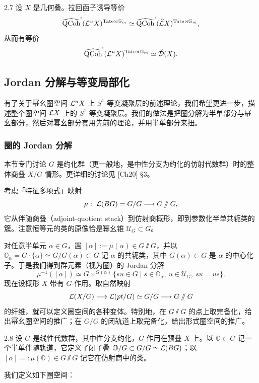\begin{thm}{2.7}\label{thm:a5-02-3}
设 $X$ 是几何叠。拉回函子诱导等价
\[
\widehat{\operatorname{QCoh}}^!(\mathcal{L}^uX)^{\mathrm{Tate}\rtimes\mathbb{G}_m}\simeq\widehat{\operatorname{QCoh}}^!(\widehat{\mathcal{L}} X)^{\mathrm{Tate}\rtimes\mathbb{G}_m},
\]
从而有等价
\[
\widehat{\operatorname{QCoh}}^!(\mathcal{L}^uX)^{\mathrm{Tate}\rtimes\mathbb{G}_m}\simeq\check{\mathcal{D}}(X).
\]
\end{thm}

\subsection{Jordan 分解与等变局部化}
有了关于幂幺圈空间 $\mathcal{L}^uX$ 上 $S^1$-等变凝聚层的前述理论，我们希望更进一步，描述整个圈空间 $\mathcal{L} X$ 上的 $S^1$-等变凝聚层。我们的做法是把圈分解为半单部分与幂幺部分，然后对幂幺部分套用先前的理论，并用半单部分来扭。

\subsubsection{圈的 Jordan 分解}
本节专门讨论 $G$ 是约化群（更一般地，是中性分支为约化的仿射代数群）时的整体商叠 $X/G$ 情形。更详细的讨论见 [Ch20] §3。

考虑「特征多项式」映射
\[
\mu:\ \LL(BG)=G/G\lra G\sslash G,
\]
它从伴随商叠（adjoint-quotient stack）到仿射商概形，即到参数化半单共轭类的簇。注意恒等元的类的原像恰是幂幺锥 $\mathcal U_G\subset G$。

对任意半单元 $\alpha\in G$，置 $[\alpha]:=\mu(\alpha)\in G\sslash G$，并以 $\mathbb O_\alpha=G\cdot\{\alpha\}\simeq G/G(\alpha)\subset G$ 记 $\alpha$ 的共轭类，其中 $G(\alpha)\subset G$ 是 $\alpha$ 的中心化子。于是我们得到群元素（视为圈）的 Jordan 分解
\[
\mu^{-1}([\alpha])\simeq G\times^{G(\alpha)}\{su\in G\mid s\in\mathbb O_\alpha,\ u\in\mathcal U_G,\ su=us\}.
\]
现在设概形 $X$ 带有 $G$-作用。取自然映射
\[
\mathcal{L}(X/G)\longrightarrow\mathcal{L}(pt/G)\simeq G/G\longrightarrow G\sslash G
\]
的纤维，就可以定义圈空间的各种变体。特别地，在 $G\sslash G$ 的点上取完备化，给出幂幺圈空间的推广；在 $G/G$ 的闭轨道上取完备化，给出形式圈空间的推广。

\begin{defn}{2.8}\label{defn:a5-02-1}
设 $G$ 是线性代数群，其中性分支约化，$G$ 作用在预叠 $X$ 上。以 $\mathbb O\subset G$ 记一个半单伴随轨道，它定义了闭子叠 $\mathbb O/G\subset G/G\simeq\mathcal{L}(BG)$；以 $[\alpha]=:\mu(\mathbb O)\in G\sslash G$ 记它在仿射商中的类。
\end{defn}

我们定义如下圈空间：

